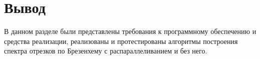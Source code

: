 \section*{Вывод}

В данном разделе были представлены требования к программному обеспечению и средства реализации, реализованы и протестированы алгоритмы построения спектра отрезков по Брезенхему с распараллеливанием и без него.

